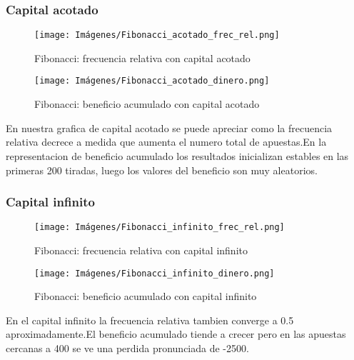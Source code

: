 \documentclass{article}
\begin{document}
\subsubsection{Capital acotado}
\begin{figure*}[!htb]
   \begin{minipage}{0.48\textwidth}
     \centering
     \texttt{[image: Imágenes/Fibonacci\_acotado\_frec\_rel.png]}
     \caption*{Fibonacci: frecuencia relativa con capital acotado}\label{Fig:Data1}
   \end{minipage}\hfill
   \begin{minipage}{0.48\textwidth}
     \centering
     \texttt{[image: Imágenes/Fibonacci\_acotado\_dinero.png]}
     \caption*{Fibonacci: beneficio acumulado con capital acotado}\label{Fig:Data2}
   \end{minipage}
\end{figure*}

En nuestra grafica de capital acotado se puede apreciar como la frecuencia relativa decrece a medida que aumenta el numero total de apuestas.En la representacion de beneficio acumulado los resultados inicializan estables en las primeras 200 tiradas, luego los valores del beneficio son muy aleatorios.

\subsubsection{Capital infinito}
\begin{figure*}[!htb]
   \begin{minipage}{0.48\textwidth}
     \centering
     \texttt{[image: Imágenes/Fibonacci\_infinito\_frec\_rel.png]}
     \caption*{Fibonacci: frecuencia relativa con capital infinito}\label{Fig:Data1}
   \end{minipage}\hfill
   \begin{minipage}{0.48\textwidth}
     \centering
     \texttt{[image: Imágenes/Fibonacci\_infinito\_dinero.png]}
     \caption*{Fibonacci: beneficio acumulado con capital infinito}\label{Fig:Data2}
   \end{minipage}
\end{figure*}

En el capital infinito la frecuencia relativa tambien converge a 0.5 aproximadamente.El beneficio acumulado tiende a crecer pero en las apuestas cercanas a 400 se ve una perdida pronunciada de -2500.
\newpage
\end{document}
